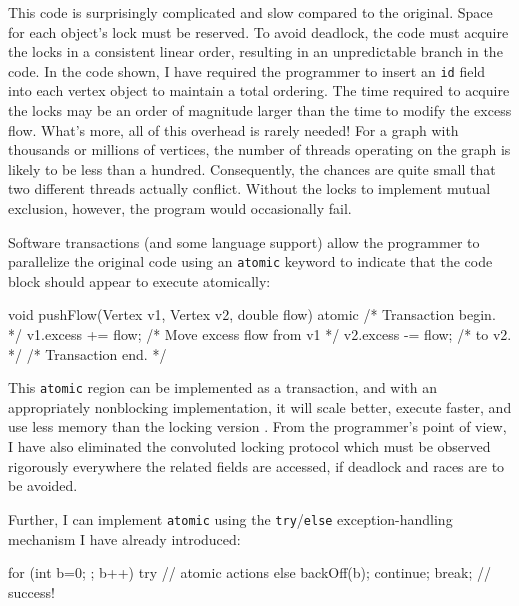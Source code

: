 This code is surprisingly complicated and slow compared to the
original.  Space for each object's lock must be reserved.
To avoid deadlock, the code must acquire the locks in
a consistent linear order, resulting in an unpredictable branch in the
code.  In the code shown,
I have required the programmer to insert an \texttt{id} field into
each vertex object to maintain a total ordering.
The time required to acquire the locks may be
an order of magnitude larger than the time to
modify the excess flow.
What's more, all of this overhead is rarely
needed!  For a graph with thousands or millions of vertices, the
number of threads operating on the graph is likely to be less than a
hundred.  Consequently, the chances are quite small that two different
threads actually conflict.  Without the locks to implement mutual
exclusion, however, the program would occasionally fail.

Software transactions (and some language support) allow the
programmer to parallelize the original code using an \texttt{atomic}
keyword to indicate that the code block should appear to execute
atomically: 
\begin{inlinecode}
void pushFlow(Vertex v1, Vertex v2, double flow) {
  atomic { /* Transaction begin. */
    v1.excess += flow; /* Move excess flow from v1 */
    v2.excess -= flow; /* to v2.                   */
  } /* Transaction end. */
}
\end{inlinecode}

This {\tt atomic} region can be implemented as a transaction, and
with an appropriately nonblocking implementation, it
will scale better, execute faster, and use less memory than the locking version
\cite{AnanianAsKuLeLi05,HarrisFr03,GreenwaldCh96,MassalinPu91,HerlihyMo93,ShavitTo95}.
From the programmer's point of view, I have also eliminated the
convoluted locking protocol which must
be observed rigorously everywhere the related fields are accessed, if
deadlock and races are to be avoided.

Further, I can implement {\tt atomic} using the {\tt try}/{\tt else}
exception-handling mechanism I have already introduced:
\begin{inlinecode}
for (int b=0; ; b++) {
  try {
    // atomic actions
  } else {
    backOff(b);
    continue;
  }
  break; // success!
}
\end{inlinecode}

